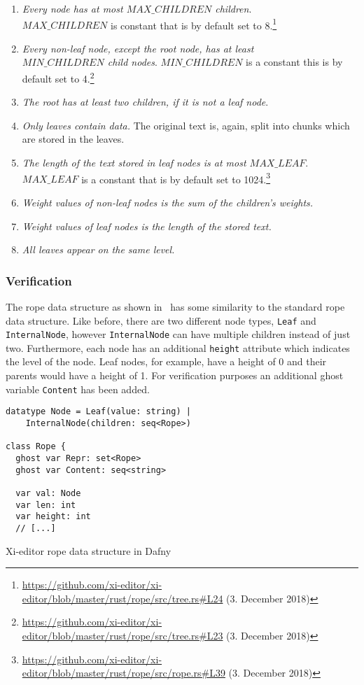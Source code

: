 \begin{enumerate}
  \item \textit{Every node has at most $MAX\_CHILDREN$ children}. \\ $MAX\_CHILDREN$ is constant that is by default set to 8.\footnote{\url{https://github.com/xi-editor/xi-editor/blob/master/rust/rope/src/tree.rs\#L24} (3. December 2018)}
  \item \textit{Every non-leaf node, except the root node, has at least \\ $MIN\_CHILDREN$ child nodes}. $MIN\_CHILDREN$ is a constant this is by default set to 4.\footnote{\url{https://github.com/xi-editor/xi-editor/blob/master/rust/rope/src/tree.rs\#L23} (3. December 2018)}
  \item \textit{The root has at least two children, if it is not a leaf node}. 
  \item \textit{Only leaves contain data.} The original text is, again, split into chunks which are stored in the leaves.
  \item \textit{The length of the text stored in leaf nodes is at most $MAX\_LEAF$}. $MAX\_LEAF$ is a constant that is by default set to 1024.\footnote{\url{https://github.com/xi-editor/xi-editor/blob/master/rust/rope/src/rope.rs\#L39} (3. December 2018)}
  \item \textit{Weight values of non-leaf nodes is the sum of the children's weights.}
  \item \textit{Weight values of leaf nodes is the length of the stored text.}
  \item \textit{All leaves appear on the same level.}
\end{enumerate}
  
\subsubsection{Verification}

The rope data structure as shown in~ has some similarity to the standard rope data structure.
Like before, there are two different node types, \texttt{Leaf} and \texttt{InternalNode}, however \texttt{InternalNode} can have multiple children instead of just two. 
Furthermore, each node has an additional \texttt{height} attribute which indicates the level of the node. 
Leaf nodes, for example, have a height of 0 and their parents would have a height of 1.
For verification purposes an additional ghost variable \texttt{Content} has been added.

\begin{listing}[h!]
\begin{verbatim}
datatype Node = Leaf(value: string) | 
    InternalNode(children: seq<Rope>)

class Rope {
  ghost var Repr: set<Rope>
  ghost var Content: seq<string>

  var val: Node
  var len: int
  var height: int
  // [...]
\end{verbatim}
    \caption{Xi-editor rope data structure in Dafny}
    \label{lst:xi-rope}
\end{listing}

